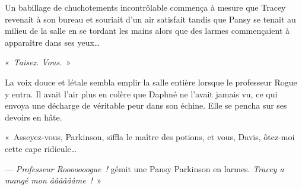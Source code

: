 Un babillage de chuchotements incontrôlable commença à mesure que Tracey revenait à son bureau et souriait d'un air satisfait tandis que Pansy se tenait au milieu de la salle en se tordant les mains alors que des larmes commençaient à apparaître dans ses yeux…

«~\emph{Taisez. Vous.}~»

La voix douce et létale sembla emplir la salle entière lorsque le professeur Rogue y entra. Il avait l'air plus en colère que Daphné ne l'avait jamais vu, ce qui envoya une décharge de véritable peur dans son échine. Elle se pencha sur ses devoirs en hâte.

«~Asseyez-vous, Parkinson, siffla le maître des potions, et vous, Davis, ôtez-moi cette cape ridicule…

--- \emph{Professeur Rooooooogue~!} gémit une Pansy Parkinson en larmes. \emph{Tracey a mangé mon ââââââme~!}~»
